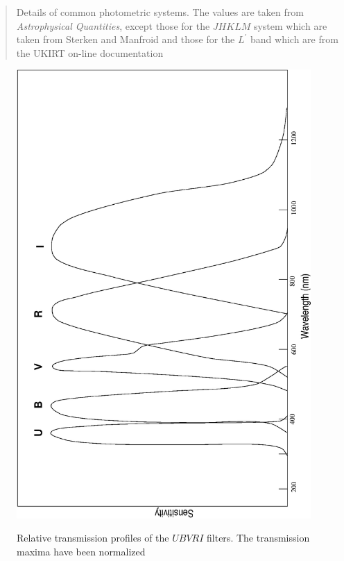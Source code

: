 \documentclass[twoside,11pt]{article}
\newcommand{\htmladdnormallink}[2]{#1}
\begin{document}
\begin{description}
\begin{table}[htbp]
  \begin{quote}
  \caption[Details of common photometric systems.]{Details 
   of common photometric systems.  The values are taken from {\it
   Astrophysical Quantities}\/\cite{AQ3}, except those for the $JHKLM$
   system which are taken from Sterken and Manfroid\cite{STERKEN92} and
   those for the $L^{\prime}$ band which are from the 
  \htmladdnormallink{UKIRT on-line documentation}
   {http://www.jach.hawaii.edu/UKIRT/home.html}
  \label{PHOTODET} }
  \end{quote}

  \end{table}

  \begin{figure}[htbp]
     \centering 
     \includegraphics[totalheight=4.5in,angle=270]{sc6_ubv.ps}
     \begin{quote}
     \caption{Relative transmission profiles of the $UBVRI$ filters.
      The transmission maxima have been normalized
     \label{UBV} }
     \end{quote}
  \end{figure}


\end{description}
\end{document}
